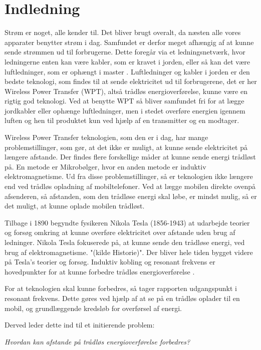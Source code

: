 \chapter{Indledning}
Strøm er noget, alle kender til. Det bliver brugt overalt, da næsten alle vores apparater benytter strøm i dag. Samfundet er derfor meget afhængig af at kunne sende strømmen ud til forbrugerne. Dette foregår via et ledningsnetværk, hvor ledningerne enten kan være kabler, som er kravet i jorden, eller så kan det være luftledninger, som er ophængt i master \cite{elforsyning}. Luftledninger og kabler i jorden er den bedste teknologi, som findes til at sende elektricitet ud til forbrugerene, det er her Wireless Power Transfer (WPT), altså trådløs energioverførelse, kunne være en rigtig god teknologi. Ved at benytte WPT så bliver samfundet fri for at lægge jordkabler eller ophænge luftledninger, men i stedet overføre energien igennem luften og hen til produktet kun ved hjælp af en transmitter og en modtager.

Wireless Power Transfer teknologien, som den er i dag, har mange problemstillinger, som gør, at det ikke er muligt, at kunne sende elektricitet på længere afstande. Der findes flere forskellige måder at kunne sende energi trådløst på. En metode er Mikrobølger, hvor en anden metode er induktiv elektromagnetisme. Ud fra disse problemstillinger, så er teknologien ikke længere end ved trådløs opladning af mobiltelefoner. Ved at lægge mobilen direkte ovenpå afsenderen, så afstanden, som den trådløse energi skal løbe, er mindst mulig, så er det muligt, at kunne oplade mobilen trådløst.

Tilbage i 1890 begyndte fysikeren Nikola Tesla (1856-1943) at udarbejde teorier og forsøg omkring at kunne overføre elektricitet over afstande uden brug af ledninger. Nikola Tesla fokuserede på, at kunne sende den trådløse energi, ved brug af elektromagnetisme. "(kilde Historie)". Der bliver hele tiden bygget videre på Tesla's teorier og forsøg. Induktiv kobling og resonant frekvens er hovedpunkter for at kunne forbedre trådløs energioverførelse \cite{mit}.

For at teknologien skal kunne forbedres, så tager rapporten udgangspunkt i resonant frekvens. Dette gøres ved hjælp af at se på en trådløs oplader til en mobil, og grundlæggende kredsløb for overførsel af energi.

Derved leder dette ind til et initierende problem:

\textit{Hvordan kan afstande på trådløs energioverførelse forbedres?}